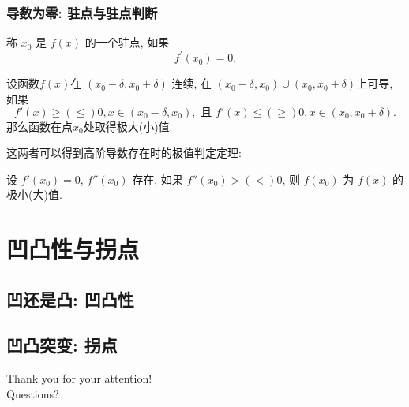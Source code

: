\documentclass[
10pt,
aspectratio=43,
]{beamer}
\begin{document}
\begin{frame}
	\frametitle{导数为零: 驻点与驻点判断}
	\begin{block}{}
		称 $x_0$ 是 $f(x)$ 的一个驻点, 如果
		$$
			f^{\prime}\left(x_0\right)=0.
		$$
	\end{block}
	\begin{block}{}
		设函数$f(x)$在 $(x_0-\delta,x_0+\delta)$ 连续, 在 $(x_0-\delta,x_0)\cup(x_0,x_0+\delta)$上可导, 如果
		$$
			f'(x)\ge(\le)0, x\in(x_0-\delta,x_0),\,\,\text{且} \,\,f'(x)\le(\ge)0, x\in(x_0,x_0+\delta).
		$$
		那么函数在点$x_0$处取得极大(小)值.
	\end{block}
	这两者可以得到高阶导数存在时的极值判定定理:
	\begin{exampleblock}{}
		设 $f'(x_0)=0$, $f''(x_0)$ 存在, 如果 $f''(x_0)>(<)0$, 则 $f(x_0)$ 为 $f(x)$ 的极小(大)值. 
	\end{exampleblock}
\end{frame}

\section{凹凸性与拐点}
\subsection{凹还是凸: 凹凸性}

\subsection{凹凸突变: 拐点}

\begin{frame}[plain]
	\vfill
	\centering
	{
		\centering \Huge \color{white} Thank you for your attention!\\[10pt]Questions?
	}
	\vfill
\end{frame}
\end{document}
